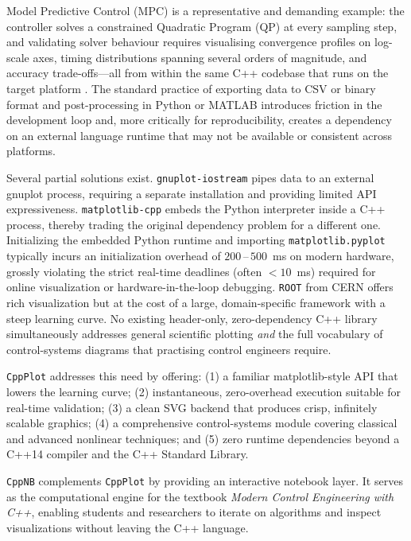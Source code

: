 \documentclass[preprint,12pt]{elsarticle}
\begin{document}
Model Predictive Control (MPC) is a representative and demanding example: the controller solves a constrained Quadratic Program (QP) at every sampling step, and validating solver behaviour requires visualising convergence profiles on log-scale axes, timing distributions spanning several orders of magnitude, and accuracy trade-offs—all from within the same C++ codebase that runs on the target platform \cite{Stellato2020}. The standard practice of exporting data to CSV or binary format and post-processing in Python or MATLAB introduces friction in the development loop and, more critically for reproducibility, creates a dependency on an external language runtime that may not be available or consistent across platforms.

Several partial solutions exist. \texttt{gnuplot-iostream} \cite{gnuplotiostream} pipes data to an external gnuplot process, requiring a separate installation and providing limited API expressiveness. \texttt{matplotlib-cpp} \cite{Lenz2014} embeds the Python interpreter inside a C++ process, thereby trading the original dependency problem for a different one. Initializing the embedded Python runtime and importing \texttt{matplotlib.pyplot} typically incurs an initialization overhead of $200$\,--\,$500$~ms on modern hardware, grossly violating the strict real-time deadlines (often $<10$~ms) required for online visualization or hardware-in-the-loop debugging. \texttt{ROOT} \cite{Brun1997} from CERN offers rich visualization but at the cost of a large, domain-specific framework with a steep learning curve. No existing header-only, zero-dependency C++ library simultaneously addresses general scientific plotting \textit{and} the full vocabulary of control-systems diagrams that practising control engineers require.

\texttt{CppPlot} addresses this need by offering: (1) a familiar matplotlib-style API that lowers the learning curve; (2) instantaneous, zero-overhead execution suitable for real-time validation; (3) a clean SVG backend that produces crisp, infinitely scalable graphics; (4) a comprehensive control-systems module covering classical and advanced nonlinear techniques; and (5) zero runtime dependencies beyond a C++14 compiler and the C++ Standard Library.

\texttt{CppNB} complements \texttt{CppPlot} by providing an interactive notebook layer. It serves as the computational engine for the textbook \textit{Modern Control Engineering with C++}, enabling students and researchers to iterate on algorithms and inspect visualizations without leaving the C++ language. 
\end{document}
